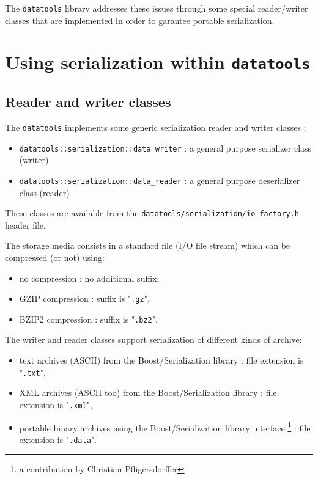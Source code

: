 \documentclass[a4paper,12pt]{article}
\newcommand{\pn}{\par\noindent}
\newcommand{\TT}[1]{"\texttt{#1}"}
\begin{document}
The \texttt{datatools} library addresses these issues through some
special reader/writer classes that  are implemented in order 
to garantee portable serialization.


\section{Using serialization within  \texttt{datatools}}

\subsection{Reader and writer classes}

The  \texttt{datatools} implements  some generic  serialization reader
and writer classes :

\begin{itemize}

\item \texttt{datatools::serialization::data\_writer} : a general purpose serializer class (writer)  

\item \texttt{datatools::serialization::data\_reader} : a general purpose deserializer class (reader)  
  
\end{itemize}

\pn      These      classes      are      available      from      the
\texttt{datatools/serialization/io\_factory.h} header file.

\pn The  storage media consists in  a standard file  (I/O file stream)
which can be compressed (or not) using:

\begin{itemize}
\item no compression : no additional suffix,
\item GZIP compression : suffix is \TT{.gz},
\item BZIP2 compression : suffix is \TT{.bz2}.
\end{itemize}

\pn The  writer and reader classes support  serialization of different
kinds of archive:

\begin{itemize}  

\item    text archives (ASCII) from the Boost/Serialization library : file extension is \TT{.txt},

\item    XML archives (ASCII too) from the Boost/Serialization library : file extension is \TT{.xml},

\item    portable binary archives using the Boost/Serialization library interface
\footnote{a contribution by Christian Pfligersdorffer} : file extension is \TT{.data}. 

\end{itemize}
\end{document}
